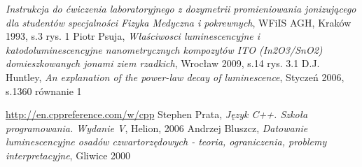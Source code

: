 \begin{thebibliography}{wstep,technologie}

  \emph{Instrukcja do ćwiczenia laboratoryjnego z dozymetrii promieniowania jonizującego dla
studentów specjalności Fizyka Medyczna i pokrewnych}, WFiIS AGH, Kraków 1993, s.3 rys. 1
Piotr Psuja,
\emph{Właściwosci luminescencyjne i katodoluminescencyjne
nanometrycznych kompozytów ITO (In2O3/SnO2)
domieszkowanych jonami ziem rzadkich}, Wrocław 2009, s.14 rys. 3.1
D.J. Huntley,
\emph{An explanation of the power-law decay of
luminescence}, Styczeń 2006, s.1360 równanie 1

\url{http://en.cppreference.com/w/cpp}
Stephen Prata, \emph{ Język C++. Szkoła programowania. Wydanie V}, Helion, 2006
\bibitem{}
Andrzej Bluszcz, \emph{Datowanie luminescencyjne osadów czwartorzędowych - teoria, ograniczenia, problemy interpretacyjne}, Gliwice 2000
\end{thebibliography}

